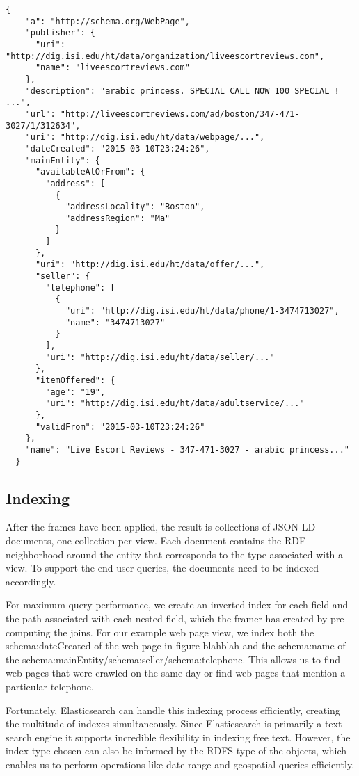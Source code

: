 \begin{verbatim}
{
    "a": "http://schema.org/WebPage",
    "publisher": {
      "uri": "http://dig.isi.edu/ht/data/organization/liveescortreviews.com",
      "name": "liveescortreviews.com"
    },
    "description": "arabic princess. SPECIAL CALL NOW 100 SPECIAL ! ...",
    "url": "http://liveescortreviews.com/ad/boston/347-471-3027/1/312634",
    "uri": "http://dig.isi.edu/ht/data/webpage/...",
    "dateCreated": "2015-03-10T23:24:26",
    "mainEntity": {
      "availableAtOrFrom": {
        "address": [
          {
            "addressLocality": "Boston",
            "addressRegion": "Ma"
          }
        ]
      },
      "uri": "http://dig.isi.edu/ht/data/offer/...",
      "seller": {
        "telephone": [
          {
            "uri": "http://dig.isi.edu/ht/data/phone/1-3474713027",
            "name": "3474713027"
          }
        ],
        "uri": "http://dig.isi.edu/ht/data/seller/..."
      },
      "itemOffered": {
        "age": "19",
        "uri": "http://dig.isi.edu/ht/data/adultservice/..."
      },
      "validFrom": "2015-03-10T23:24:26"
    },
    "name": "Live Escort Reviews - 347-471-3027 - arabic princess..."
  }
\end{verbatim}

\subsection{Indexing}
After the frames have been applied, the result is collections of JSON-LD documents, one collection per view.  
Each document contains the RDF neighborhood around the entity that corresponds to the type associated with a view.  
To support the end user queries, the documents need to be indexed accordingly.  

For maximum query performance, we create an inverted index for each field and the path associated with each nested field, which the framer has created by pre-computing the joins.  
For our example web page view,  we index both the schema:dateCreated of the web page in figure blahblah and the schema:name of the schema:mainEntity/schema:seller/schema:telephone.  
This allows us to find web pages that were crawled on the same day or find web pages that mention a particular telephone.  

Fortunately, Elasticsearch can handle this indexing process efficiently, creating the multitude of indexes simultaneously.  
Since Elasticsearch is primarily a text search engine it supports incredible flexibility in indexing free text.  
However, the index type chosen can also be informed by the RDFS type of the objects, which enables us to perform operations like date range and geospatial queries efficiently.

